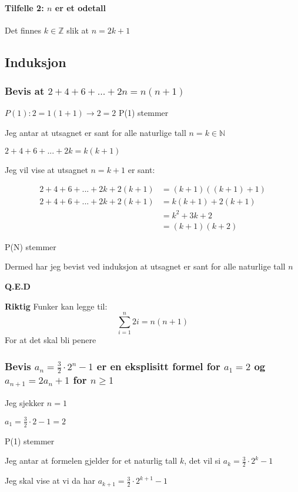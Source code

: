 \documentclass{article}
\begin{document}
\paragraph{Tilfelle 2: $n$ er et odetall}

Det finnes $k \in \mathbb{Z}$ slik at $n=2k+1$

\subsection{Induksjon}

\subsubsection{Bevis at $2+4+6+...+2n=n(n+1)$}

$P(1): 2=1(1+1) \rightarrow 2=2$ P(1) stemmer 

Jeg antar at utsagnet er sant for alle naturlige tall $n=k \in \mathbb{N}$

$2+4+6+...+2k=k(k+1)$

Jeg vil vise at utsagnet $n = k + 1$ er sant:

\begin{align*}
    2+4+6+...+2k+2(k+1) &= (k+1)((k+1) + 1) \\
    2+4+6+...+2k+2(k+1) &= k(k+1)+2(k+1) \\
    &= k^2+3k+2 \\
    &= (k+1)(k+2)
\end{align*}

P(N) stemmer

Dermed har jeg bevist ved induksjon at utsagnet er sant for alle naturlige tall $n$

\textbf{Q.E.D}

\textbf{Riktig}
Funker kan legge til:
\[
\sum_{i=1}^{n} 2i = n(n + 1)
\]
For at det skal bli penere

\subsubsection{Bevis $a_n=\frac{3}{2} \cdot 2^n -1$ er en eksplisitt formel for $a_1=2$ og $a_{n+1}=2a_n+1$ for $n \ge 1$}

Jeg sjekker $n=1$

$a_1=\frac{3}{2} \cdot 2 - 1 = 2$

P(1) stemmer

Jeg antar at formelen gjelder for et naturlig tall $k$, det vil si  $a_k=\frac{3}{2} \cdot 2^k - 1$

Jeg skal vise at vi da har $a_{k+1} = \frac{3}{2} \cdot 2^{k+1} - 1$
\end{document}
